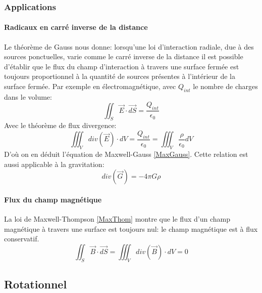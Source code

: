 \documentclass[10pt,a4paper]{article}
\begin{document}
\subsubsection{Applications}
\paragraph*{Radicaux en carré inverse de la distance}
Le théorème de Gauss nous donne: lorsqu'une loi d'interaction radiale, due à des sources ponctuelles, varie comme le carré inverse de la distance il est possible d'établir que le flux du champ d'interaction à travers une surface fermée est toujours proportionnel à la quantité de sources présentes à l'intérieur de la surface fermée. Par exemple en électromagnétique, avec $Q_{int}$ le nombre de charges dans le volume:
\begin{equation}
\iint_{S}\overrightarrow{E}\cdot\overrightarrow{dS} = \frac{Q_{int}}{\epsilon_{0}}
\end{equation}
Avec le théorème de flux divergence:
\begin{equation}
\iiint_{V}div(\overrightarrow{E})\cdot dV = \frac{Q_{int}}{\epsilon_{0}} = \iiint_{V}\frac{\rho}{\epsilon_{0}}dV
\end{equation}
D'où on en déduit l'équation de Maxwell-Gauss \ref{MaxGauss}. Cette relation est aussi applicable à la gravitation:
\begin{equation}
div(\overrightarrow{G}) = -4\pi G\rho
\end{equation}

\paragraph*{Flux du champ magnétique}
La loi de Maxwell-Thompson \ref{MaxThom} montre que le flux d'un champ magnétique à travers une surface est toujours nul: le champ magnétique est à flux conservatif.
\begin{equation}
\iint_{S}\overrightarrow{B}\cdot \overrightarrow{dS} = \iiint_{V}div(\overrightarrow{B})\cdot dV = 0
\label{consmagn}
\end{equation}


\subsection{Rotationnel \cite{rotationnel}}
\end{document}
